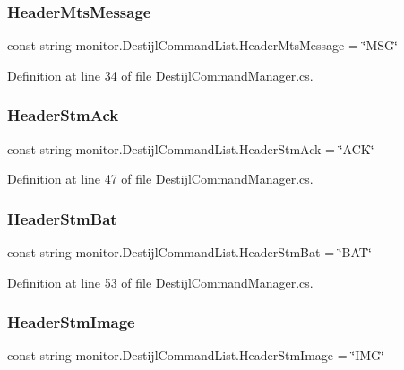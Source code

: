 \subsubsection{Header\+Mts\+Message}
{\footnotesize\ttfamily const string monitor.\+Destijl\+Command\+List.\+Header\+Mts\+Message = \char`\"{}M\+SG\char`\"{}}



Definition at line 34 of file Destijl\+Command\+Manager.\+cs.

\mbox{\label{classmonitor_1_1_destijl_command_list_af494d7e1bddee8184873dc380a3066ba}} 
\subsubsection{Header\+Stm\+Ack}
{\footnotesize\ttfamily const string monitor.\+Destijl\+Command\+List.\+Header\+Stm\+Ack = \char`\"{}A\+CK\char`\"{}}



Definition at line 47 of file Destijl\+Command\+Manager.\+cs.

\mbox{\label{classmonitor_1_1_destijl_command_list_a88de91fa6abdc122245ceb26fc21fd33}} 
\subsubsection{Header\+Stm\+Bat}
{\footnotesize\ttfamily const string monitor.\+Destijl\+Command\+List.\+Header\+Stm\+Bat = \char`\"{}B\+AT\char`\"{}}



Definition at line 53 of file Destijl\+Command\+Manager.\+cs.

\mbox{\label{classmonitor_1_1_destijl_command_list_ae3ee8e0ecbb79faec9d24095d72cfbde}} 
\subsubsection{Header\+Stm\+Image}
{\footnotesize\ttfamily const string monitor.\+Destijl\+Command\+List.\+Header\+Stm\+Image = \char`\"{}I\+MG\char`\"{}}



